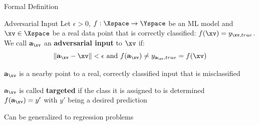 \documentclass[10pt,compress,t,notes=noshow, xcolor=table]{beamer}
\begin{document}
\begin{framev}[align=top]{Formal Definition}
\begin{block}{Adversarial Input}
Let $\epsilon > 0$, $f:\Xspace \rightarrow \Yspace$ be an ML model and $\xv \in \Xspace$ be a real data point that is correctly classified: $f(\xv)=y_{\xv,true}$.\\
\spacer[0.25]
We call $\mathbf{a}_{\xv}$ an \textbf{adversarial input} to $\xv$ if:
\begin{equation*}
\|\mathbf{a}_{\xv} - \xv\| < \epsilon \text{ and } f(\mathbf{a}_{\xv}) \neq y_{\mathbf{a}_{\xv},true} = f(\xv)
\end{equation*}
\end{block}
\begin{itemizeM}
\item $\mathbf{a}_{\xv}$ is a nearby point to a real, correctly classified input that is misclassified
\item $\mathbf{a}_{\xv}$ is called \textbf{targeted} if the class it is assigned to is determined\\
$f(\mathbf{a}_{\xv})=y'$ with $y'$ being a desired prediction
\item Can be generalized to regression problems
\end{itemizeM}
\end{framev}


\end{document}
